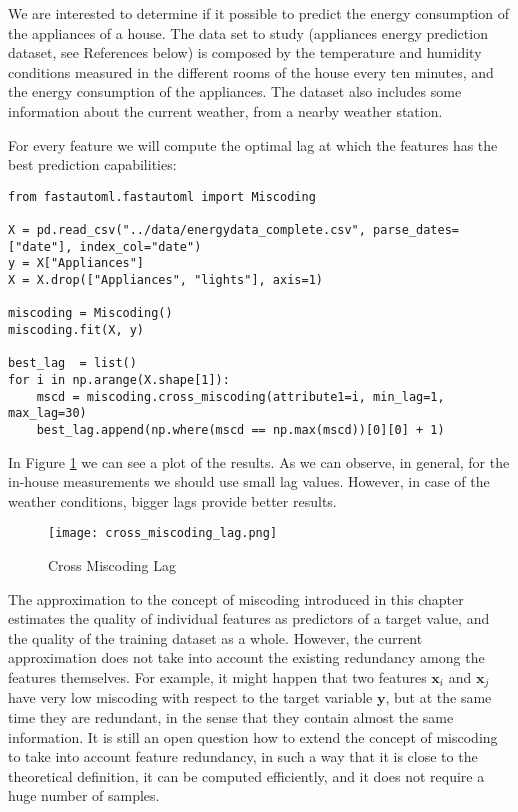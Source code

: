 \begin{example}
We are interested to determine if it possible to predict the energy consumption of the appliances of a house. The data set to study (appliances energy prediction dataset, see References below) is composed by the temperature and humidity conditions measured in the different rooms of the house every ten minutes, and the energy consumption of the appliances. The dataset also includes some information about the current weather, from a nearby weather station.

For every feature we will compute the optimal lag at which the features has the best prediction capabilities:

\begin{sourcecode}
{\scriptsize \begin{verbatim}
from fastautoml.fastautoml import Miscoding

X = pd.read_csv("../data/energydata_complete.csv", parse_dates=["date"], index_col="date")
y = X["Appliances"]
X = X.drop(["Appliances", "lights"], axis=1)

miscoding = Miscoding()
miscoding.fit(X, y)

best_lag  = list()
for i in np.arange(X.shape[1]):
    mscd = miscoding.cross_miscoding(attribute1=i, min_lag=1, max_lag=30)
    best_lag.append(np.where(mscd == np.max(mscd))[0][0] + 1)
\end{verbatim}}
\end{sourcecode}

In Figure \ref{figure:cross-miscoding} we can see a plot of the results. As we can observe, in general, for the in-house measurements we should use small lag values. However, in case of the weather conditions, bigger lags provide better results.

\begin{figure}[h]
\centering
\texttt{[image: cross\_miscoding\_lag.png]}
\caption{Cross Miscoding Lag}
\label{figure:cross-miscoding}
\end{figure}

\end{example}

\begin{remark}
The approximation to the concept of miscoding introduced in this chapter estimates the quality of individual features as predictors of a target value, and the quality of the training dataset as a whole. However, the current approximation does not take into account the existing redundancy among the features themselves. For example, it might happen that two features $\mathbf{x}_i$ and $\mathbf{x}_j$ have very low miscoding with respect to the target variable $\mathbf{y}$, but at the same time they are redundant, in the sense that they contain almost the same information. It is still an open question how to extend the concept of miscoding to take into account feature redundancy, in such a way that it is close to the theoretical definition, it can be computed efficiently, and it does not require a huge number of samples.
\end{remark}


